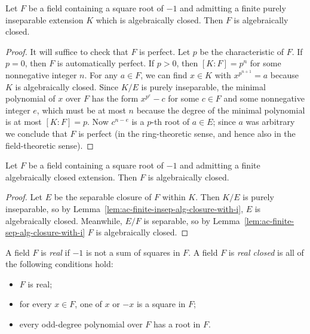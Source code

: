 \begin{lemma} \label{lem:ac-finite-insep-alg-closure-with-i}
\leanok
Let $F$ be a field containing a square root of $-1$ and admitting a finite purely inseparable extension $K$ which is algebraically closed. Then $F$ is algebraically closed.
\end{lemma}
\begin{proof}
\leanok
It will suffice to check that $F$ is perfect.
Let $p$ be the characteristic of $F$. If $p = 0$, then $F$ is automatically perfect.
If $p > 0$, then $[K:F] = p^n$ for some nonnegative integer $n$. For any $a \in F$, we can find $x \in K$ with $x^{p^{n+1}} = a$ because $K$ is algebraically closed. Since $K/E$ is purely inseparable, the minimal polynomial of $x$ over $F$ has the form $x^{p^e}-c$ for some $c \in F$ and some nonnegative integer $e$, which must be at most $n$ because the degree of the minimal polynomial is at most $[K:F] = p$.
Now $c^{n-e}$ is a $p$-th root of $a \in E$; since $a$ was arbitrary we conclude that $F$ is perfect (in the ring-theoretic sense, and hence also in the field-theoretic sense).
\end{proof}

\begin{lemma} \label{lem:ac-finite-alg-closure-with-i}
\leanok
Let $F$ be a field containing a square root of $-1$ and admitting a finite algebraically closed extension. Then $F$ is algebraically closed.
\end{lemma}
\begin{proof}
\mathlibok
Let $E$ be the separable closure of $F$ within $K$. Then $K/E$ is purely inseparable, so by Lemma~\ref{lem:ac-finite-insep-alg-closure-with-i}, $E$ is algebraically closed.
Meanwhile, $E/F$ is 
separable, so by 
Lemma~\ref{lem:ac-finite-sep-alg-closure-with-i} $F$ is algebraically closed.
\end{proof}

\begin{definition} \label{def:real closed field}
\mathlibok
A field $F$ is \emph{real} if $-1$ is not a sum of squares in $F$.
A field $F$ is \emph{real closed} is all of the following conditions hold:
\begin{itemize}
\item $F$ is real;
\item for every $x \in F$, one of $x$ or $-x$ is a square in $F$;
\item every odd-degree polynomial over $F$ has a root in $F$.
\end{itemize}
\end{definition}

